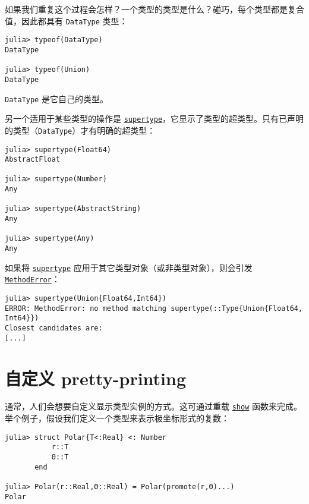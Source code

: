 如果我们重复这个过程会怎样？一个类型的类型是什么？碰巧，每个类型都是复合值，因此都具有 \texttt{DataType} 类型：




\begin{verbatim}
julia> typeof(DataType)
DataType

julia> typeof(Union)
DataType
\end{verbatim}



\texttt{DataType} 是它自己的类型。



另一个适用于某些类型的操作是 \hyperlink{12192788431675298651}{\texttt{supertype}}，它显示了类型的超类型。只有已声明的类型（\texttt{DataType}）才有明确的超类型：




\begin{verbatim}
julia> supertype(Float64)
AbstractFloat

julia> supertype(Number)
Any

julia> supertype(AbstractString)
Any

julia> supertype(Any)
Any
\end{verbatim}



如果将 \hyperlink{12192788431675298651}{\texttt{supertype}} 应用于其它类型对象（或非类型对象），则会引发 \hyperlink{68769522931907606}{\texttt{MethodError}}：




\begin{verbatim}
julia> supertype(Union{Float64,Int64})
ERROR: MethodError: no method matching supertype(::Type{Union{Float64, Int64}})
Closest candidates are:
[...]
\end{verbatim}



\hypertarget{10200728548672135026}{}


\section{自定义 pretty-printing}



通常，人们会想要自定义显示类型实例的方式。这可通过重载 \hyperlink{14071376285304310153}{\texttt{show}} 函数来完成。举个例子，假设我们定义一个类型来表示极坐标形式的复数：




\begin{verbatim}
julia> struct Polar{T<:Real} <: Number
           r::T
           Θ::T
       end

julia> Polar(r::Real,Θ::Real) = Polar(promote(r,Θ)...)
Polar
\end{verbatim}



